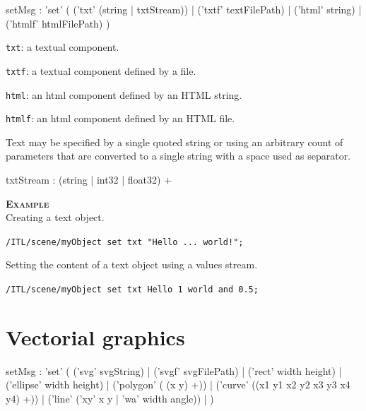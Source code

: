 \documentclass[a4paper,twoside]{report}
\newcommand{\sublevel}[1]	{\section{#1}}
\newcommand{\OSC}[1]		{\texttt{#1}}
\newcommand{\example}		{\textbf{\hspace{-1.5cm}\textbf{\textsc{Example }}}}
\let\olditemize\itemize
\let\oldenditemize\enditemize
\renewenvironment{itemize} 	{\olditemize \setlength{\itemsep}{1mm}}{\oldenditemize}
\newcommand{\sample}	[1]			{\vspace{-2mm}\begin{center}\colorbox{mygrey}{
								\begin{minipage}[t]{0.9\columnwidth} 
								{\small \texttt{#1}}
								\end{minipage}}\end{center}}
\begin{document}
\begin{rail}
setMsg : 'set' (
	('txt' (string | txtStream)) |
	('txtf' textFilePath) |
	('html' string) |
	('htmlf' htmlFilePath)
)
\end{rail}

\begin{itemize}
\item \OSC{txt}: a textual component.
\item \OSC{txtf}: a textual component defined by a file.
\item \OSC{html}: an html component defined by an HTML string.
\item \OSC{htmlf}: an html component defined by an HTML file.
\end{itemize}

Text may be specified by a single quoted string or using an arbitrary count of parameters that are converted to a single string with a space used as separator.
\begin{rail}
txtStream :  (string | int32 | float32) +
\end{rail}

\example \\
Creating a text object.
\sample{/ITL/scene/myObject set txt "Hello ...    world!";}
Setting the content of a text object using a values stream.
\sample{/ITL/scene/myObject set txt Hello 1 world and 0.5; }


\sublevel{Vectorial graphics}
\label{vgraphscore}
\begin{rail}
setMsg : 'set' (
	('svg' svgString) |
	('svgf' svgFilePath) |
	('rect' width height) |
	('ellipse' width height) |
	('polygon' ( (x y) +)) |
	('curve' ((x1 y1 x2 y2 x3 y3 x4 y4) +)) |
	('line' ('xy' x y | 'wa' width angle)) |
)
\end{rail}
\end{document}
